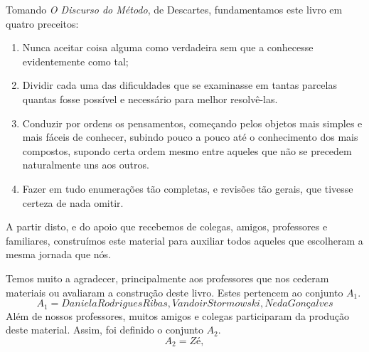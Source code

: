 
Tomando \textit{O Discurso do Método}, de Descartes, fundamentamos este livro em quatro preceitos:
\begin{enumerate}{1.}
\item Nunca aceitar coisa alguma como verdadeira sem que a conhecesse evidentemente como tal;
\item Dividir cada uma das dificuldades que se examinasse em tantas parcelas quantas fosse possível e necessário para melhor resolvê-las.
\item Conduzir por ordens os pensamentos, começando pelos objetos mais simples e mais fáceis de conhecer, subindo pouco a pouco até o conhecimento dos mais compostos, supondo certa ordem mesmo entre aqueles que não se precedem naturalmente uns aos outros.
\item Fazer em tudo enumerações tão completas, e revisões tão gerais, que tivesse certeza de nada omitir.
\end{enumerate}
A partir disto, e do apoio que recebemos de colegas, amigos, professores e familiares, construímos este material para auxiliar todos aqueles que escolheram a mesma jornada que nós. \par 
Temos muito a agradecer, principalmente aos professores que nos cederam materiais ou avaliaram a construção deste livro. Estes pertencem ao conjunto $A_1$.
\[A_1={Daniela Rodrigues Ribas, Vandoir Stormowski, Neda Gonçalves}\]
Além de nossos professores, muitos amigos e colegas participaram da produção deste material. Assim, foi definido o conjunto $A_2$.
\[A_2={Zé, }\] %